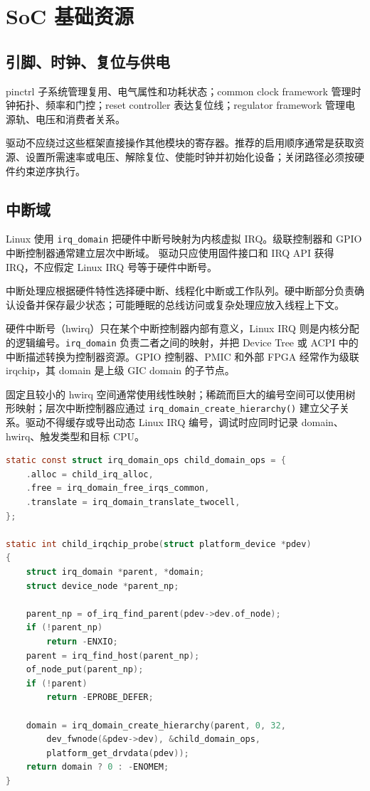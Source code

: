 \section{SoC 基础资源}

\subsection{引脚、时钟、复位与供电}

pinctrl 子系统管理复用、电气属性和功耗状态；common clock framework 管理时钟拓扑、频率和门控；reset controller 表达复位线；regulator framework 管理电源轨、电压和消费者关系。

驱动不应绕过这些框架直接操作其他模块的寄存器。推荐的启用顺序通常是获取资源、设置所需速率或电压、解除复位、使能时钟并初始化设备；关闭路径必须按硬件约束逆序执行。

\subsection{中断域}

Linux 使用 \texttt{irq\_domain} 把硬件中断号映射为内核虚拟 IRQ。级联控制器和 GPIO 中断控制器通常建立层次中断域。
驱动只应使用固件接口和 IRQ API 获得 IRQ，不应假定 Linux IRQ 号等于硬件中断号。

中断处理应根据硬件特性选择硬中断、线程化中断或工作队列。硬中断部分负责确认设备并保存最少状态；可能睡眠的总线访问或复杂处理应放入线程上下文。

硬件中断号（hwirq）只在某个中断控制器内部有意义，Linux IRQ 则是内核分配的逻辑编号。\texttt{irq\_domain} 负责二者之间的映射，并把 Device Tree 或 ACPI 中的中断描述转换为控制器资源。GPIO 控制器、PMIC 和外部 FPGA 经常作为级联 irqchip，其 domain 是上级 GIC domain 的子节点。

固定且较小的 hwirq 空间通常使用线性映射；稀疏而巨大的编号空间可以使用树形映射；层次中断控制器应通过 \texttt{irq\_domain\_create\_hierarchy()} 建立父子关系。驱动不得缓存或导出动态 Linux IRQ 编号，调试时应同时记录 domain、hwirq、触发类型和目标 CPU。

\begin{lstlisting}[language=C,caption={级联中断控制器的 domain 建立骨架}]
static const struct irq_domain_ops child_domain_ops = {
    .alloc = child_irq_alloc,
    .free = irq_domain_free_irqs_common,
    .translate = irq_domain_translate_twocell,
};

static int child_irqchip_probe(struct platform_device *pdev)
{
    struct irq_domain *parent, *domain;
    struct device_node *parent_np;

    parent_np = of_irq_find_parent(pdev->dev.of_node);
    if (!parent_np)
        return -ENXIO;
    parent = irq_find_host(parent_np);
    of_node_put(parent_np);
    if (!parent)
        return -EPROBE_DEFER;

    domain = irq_domain_create_hierarchy(parent, 0, 32,
        dev_fwnode(&pdev->dev), &child_domain_ops,
        platform_get_drvdata(pdev));
    return domain ? 0 : -ENOMEM;
}
\end{lstlisting}

